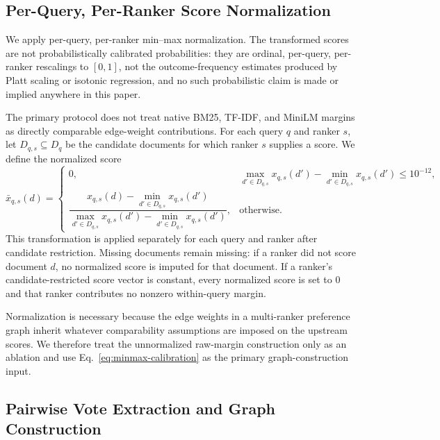 \documentclass[manuscript,anonymous,review]{acmart}
\begin{document}
\subsection{Per-Query, Per-Ranker Score Normalization}
\label{sec:score-calibration}

We apply per-query, per-ranker min--max normalization. The transformed
scores are not probabilistically calibrated probabilities: they are
ordinal, per-query, per-ranker rescalings to $[0,1]$, not the outcome-frequency
estimates produced by Platt scaling or isotonic regression, and no such
probabilistic claim is made or implied anywhere in this paper.

The primary protocol does not treat native BM25, TF-IDF, and MiniLM margins as
directly comparable edge-weight contributions. For each query $q$ and ranker
$s$, let $D_{q,s} \subseteq D_q$ be the candidate documents for which ranker
$s$ supplies a score. We define the normalized score
\begin{equation}
  \bar{x}_{q,s}(d) =
  \begin{cases}
    0, & \max_{d' \in D_{q,s}} x_{q,s}(d') - \min_{d' \in D_{q,s}} x_{q,s}(d') \le 10^{-12}, \\[4pt]
    \dfrac{x_{q,s}(d) - \min_{d' \in D_{q,s}} x_{q,s}(d')}
    {\max_{d' \in D_{q,s}} x_{q,s}(d') - \min_{d' \in D_{q,s}} x_{q,s}(d')},
    & \text{otherwise.}
  \end{cases}
  \label{eq:minmax-calibration}
\end{equation}
This transformation is applied separately for each query and ranker after
candidate restriction. Missing documents remain missing: if a ranker did not
score document $d$, no normalized score is imputed for that document. If a
ranker's candidate-restricted score vector is constant, every normalized score
is set to $0$ and that ranker contributes no nonzero within-query margin.

Normalization is necessary because the edge weights in a multi-ranker preference
graph inherit whatever comparability assumptions are imposed on the upstream
scores. We therefore treat the unnormalized raw-margin construction only as an
ablation and use Eq.~\eqref{eq:minmax-calibration} as the primary
graph-construction input.

\subsection{Pairwise Vote Extraction and Graph Construction}
\label{sec:vote-extraction}
\end{document}
